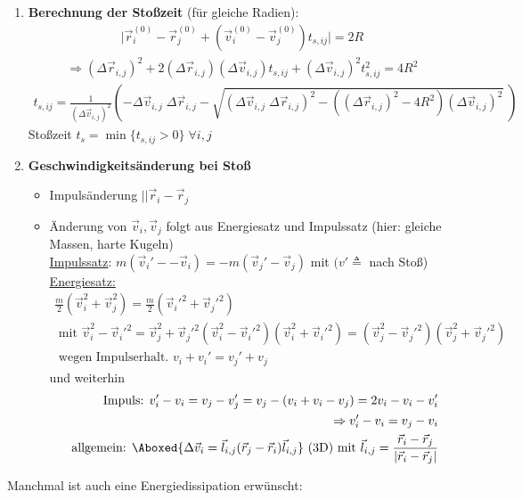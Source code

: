 \documentclass[12pt]{article}
\begin{document}
\begin{enumerate}
\item \textbf{Berechnung der Stoßzeit} (für gleiche Radien): 
\begin{align*}
\vert \vec{r}_i^{(0)} - \vec{r}_j^{(0)} + \left( \vec{v}_i^{(0)} - \vec{v}_j^{(0)} \right) t_{s,ij}  \vert = 2 R 
\end{align*}
\begin{align*}
\Rightarrow (\Delta \vec{r}_{i,j})^2 + 2(\Delta \vec{r}_{i,j})( \Delta\vec{v}_{i,j}) t_{s,ij} + (\Delta \vec{v}_{i,j})^2 t_{s,ij}^2 = 4R^2 
\end{align*}
\begin{align*}
t_{s,ij} =
 \frac{1}{(\Delta \vec{v}_{i,j})^2} 
 \left( 
 - \Delta \vec{v}_{i,j} \; \Delta \vec{r}_{i,j} - \sqrt{( \Delta \vec{v}_{i,j} \; \Delta \vec{r}_{i,j})^2 - \left( (\Delta \vec{r}_{i,j})^2 - 4R^2\right) (\Delta \vec{v}_{i,j})^2} \; \right)
\end{align*}
Stoßzeit $t_s = \min \{ t_{s,ij} > 0\} \; \forall i,j$
\item \textbf{Geschwindigkeitsänderung bei Stoß}
\begin{itemize}
\item Impulsänderung $|| \vec{r}_{i} - \vec{r}_{j}$
\item Änderung von $\vec{v}_{i}, \vec{v}_{j}$ folgt aus Energiesatz und Impulssatz (hier: gleiche Massen, harte Kugeln)\\
\underline{Impulssatz}: $m( \vec{v}_{i}' - -\vec{v}_{i}) = -m ( \vec{v}_{j}' - \vec{v}_{j}) $ mit $(v' \triangleq$ nach Stoß) \\
\underline{Energiesatz:}
\begin{align}
\frac{m}{2} (\vec{v}_{i}^2 + \vec{v}_{j}^2) = \frac{m}{2} (\vec{v}_{i}'^2  + \vec{v}_{j}'^2) \\
 \mbox{ mit }  \vec{v}_{i}^2 - \vec{v}_{i}'^2 = \vec{v}_{j}^2 + \vec{v}_{j}'^2 
 (\vec{v}_{i}^2-\vec{v}_{i}'^2)(\vec{v}_{i}^2 + \vec{v}_{i}'^2) = (\vec{v}_{j}^2 - \vec{v}_{j}'^2)(\vec{v}_{j}^2 + \vec{v}_{j}'^2) \\
 \mbox{ wegen Impulserhalt. } v_i + v_i' = v_j' + v_j 
\end{align}
und weiterhin
\begin{align}
\mbox{ Impuls: } v_i'-v_i= v_j -v_j' = v_j - (v_i + v_i - v_j) = 2 v_i - v_i -v_i' \\
\Rightarrow v_i' - v_i = v_j - v_i \\
\mbox{ allgemein: } 
\Aboxed{ \Delta \vec{v}_{i} = \vec{l}_{i,j} (\vec{r}_j - \vec{r}_i)  \vec{l}_{i,j}  }
\mbox{ (3D) mit } \vec{l}_{i,j} = \frac{\vec{r}_i - \vec{r}_j}{\vert \vec{r}_i - \vec{r}_j \vert}
\end{align}
\end{itemize}
\end{enumerate}
 Manchmal ist auch eine Energiedissipation erwünscht: \\
\end{document}
